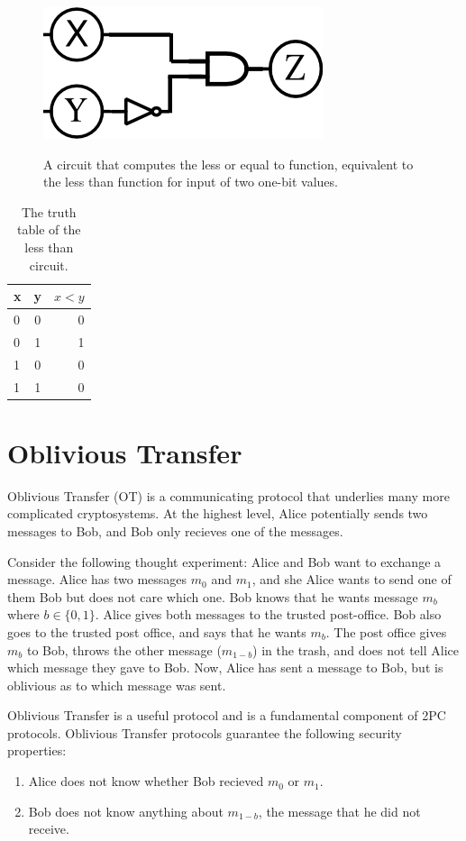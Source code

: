 \begin{figure}[h]
    \centering
    \includegraphics[scale=0.75]{images/drawing.png}
    \label{fig:less_than_circuit}
    \caption{A circuit that computes the less or equal to function, equivalent to the less than function for input of two one-bit values.}
\end{figure}

\begin{table}[h]
\label{tab:less_than}
\centering
\begin{tabular}{ | l | c || r |}
\hline
x & y & $x < y$ \\ \hline
0 & 0 & 0 \\ \hline
0 & 1 & 1 \\ \hline
1 & 0 & 0 \\ \hline
1 & 1 & 0 \\ \hline
\end{tabular}
\caption{The truth table of the less than circuit.}
\end{table}

\section{Oblivious Transfer}
Oblivious Transfer (OT) is a communicating protocol that underlies many more complicated cryptosystems.
At the highest level, Alice potentially sends two messages to Bob, and Bob only recieves one of the messages.

Consider the following thought experiment: Alice and Bob want to exchange a message.
Alice has two messages $m_0$ and $m_1$, and she Alice wants to send one of them Bob but does not care which one.
Bob knows that he wants message $m_b$ where $b \in \{0,1\}$.
Alice gives both messages to the trusted post-office. 
Bob also goes to the trusted post office, and says that he wants $m_b$. 
The post office gives $m_b$ to Bob, throws the other message ($m_{1-b}$) in the trash, and does not tell Alice which message they gave to Bob.
Now, Alice has sent a message to Bob, but is oblivious as to which message was sent.

Oblivious Transfer is a useful protocol and is a fundamental component of 2PC protocols.
Oblivious Transfer protocols guarantee the following security properties:
\begin{enumerate}
    \item Alice does not know whether Bob recieved $m_0$ or $m_1$.
    \item Bob does not know anything about $m_{1-b}$, the message that he did not receive.
\end{enumerate}



